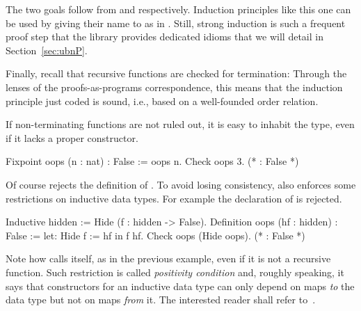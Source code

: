 The two goals follow from  and  respectively.
Induction principles like this one can be used by giving their name to  as in
. Still, strong induction is such a frequent
proof step that the \mcbMC{} library provides dedicated idioms
that we will detail in Section~\ref{sec:ubnP}.

Finally, recall that recursive functions are checked for termination:
Through the lenses of the proofs-as-programs correspondence, this means
that the induction principle just coded is sound, i.e., based on a
well-founded order relation.

If non-terminating functions are not ruled out, it is easy to inhabit
the  type, even if it lacks a proper constructor.

\begin{coq}{}{}
Fixpoint oops (n : nat) : False := oops n.
Check oops 3.  (* : False *)
\end{coq}
Of course \Coq{} rejects the definition of .  To avoid
losing consistency, \Coq{} also enforces some restrictions on
inductive data types.  For example the declaration of 
is rejected.

\begin{coq}{}{}
Inductive hidden := Hide (f : hidden -> False).
Definition oops (hf : hidden) : False := let: Hide f := hf in f hf.
Check oops (Hide oops).  (* : False *)
\end{coq}
Note how  calls itself, as in the previous example,
even if it is not a recursive function.
Such restriction is called
\emph{positivity condition} and,
roughly speaking, it says that constructors for an inductive data
type can only depend on maps \emph{to} the data type but not on maps
\emph{from} it.
The interested reader shall refer to~\cite{Coq:manual}.



